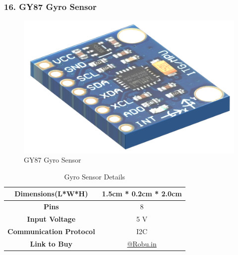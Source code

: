 \documentclass[12pt,a4paper,oneside]{book}
\begin{document}
			\subsubsection*{16. GY87 Gyro Sensor}
				\begin{figure}[H]
					\centering
					\includegraphics[scale=0.7]{GYRO ISO}
					\caption{GY87 Gyro Sensor}	 
				\end{figure}
				\begin{table}[H]
				\centering
				\def\arraystretch{1.5}
					\caption{Gyro Sensor Details}
					\vspace{0.5cm}
					\begin{tabular}{|c||c|}
						\hline
						\textbf{Dimensions(L*W*H)} & 1.5cm * 0.2cm * 2.0cm\\\hline
						\textbf{Pins} & 8\\\hline
						\textbf{Input Voltage} & 5 V\\\hline
						\textbf{Communication Protocol} &  I2C\\\hline
						\textbf{Link to Buy} & \href{https://robu.in/product/mpu6050hmc5883lbmp180-10dof-3-axis-gyro-3-axis-acceleration-3-axis-magnetic-field-air-pres/}{@Robu.in}\\\hline
					\end{tabular}
				\end{table}
				\pagebreak
				
\end{document}
